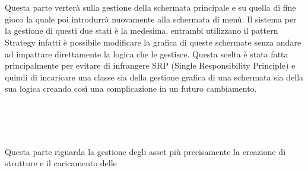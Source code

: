 \documentclass[a4paper,12pt]{report}
\begin{document}
    \\
    \\
    \par Questa parte verterà sulla gestione della schermata principale e su quella di fine gioco la quale poi introdurrà nuovamente
     alla schermata di menù. Il sistema per la gestione di questi due stati è la medesima, entrambi utilizzano il pattern Strategy
     infatti è possibile modificare la grafica di queste schermate senza andare ad impattare direttamente la logica che le gestisce.
     Questa scelta è stata fatta principalmente per evitare di infrangere SRP (Single Responsibility Principle) e quindi
     di incaricare una classe sia della gestione grafica di una schermata sia della sua logica creando così una complicazione
     in un futuro cambiamento.
    \\
    \\
    \par
    \\
    \\
    \par Questa parte riguarda la gestione degli asset più precisamente la creazione di strutture e il caricamento delle
\end{document}

